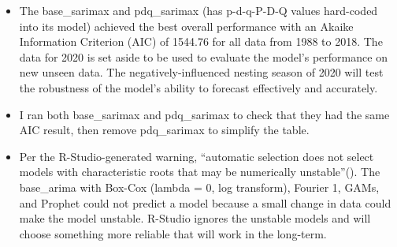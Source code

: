 \documentclass[
  letterpaper,
  DIV=11,
  numbers=noendperiod]{scrartcl}
\begin{document}
\begin{itemize}
\item
  The base\_sarimax and pdq\_sarimax (has p-d-q-P-D-Q values hard-coded
  into its model) achieved the best overall performance with an Akaike
  Information Criterion (AIC) of 1544.76 for all data from 1988 to 2018.
  The data for 2020 is set aside to be used to evaluate the model's
  performance on new unseen data. The negatively-influenced nesting
  season of 2020 will test the robustness of the model's ability to
  forecast effectively and accurately.
\item
  I ran both base\_sarimax and pdq\_sarimax to check that they had the
  same AIC result, then remove pdq\_sarimax to simplify the table.
\item
  Per the R-Studio-generated warning, ``automatic selection does not
  select models with characteristic roots that may be numerically
  unstable''(). The
  base\_arima with Box-Cox (lambda = 0, log transform), Fourier 1, GAMs,
  and Prophet could not predict a model because a small change in data
  could make the model unstable. R-Studio ignores the unstable models
  and will choose something more reliable that will work in the
  long-term.
\end{itemize}
\end{document}

